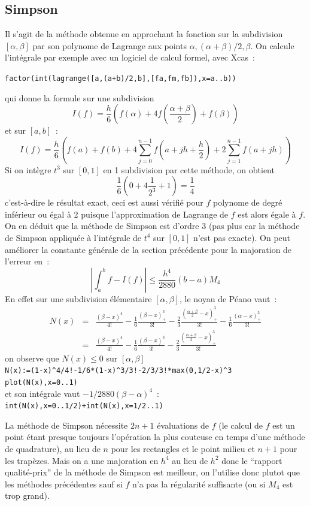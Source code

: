 \documentclass[a4paper,11pt]{article}
\begin{document}
\subsection{Simpson} 
Il s'agit de la méthode obtenue en approchant la fonction
sur la subdivision $[\alpha,\beta]$ par son polynome de Lagrange
aux points $\alpha,(\alpha+\beta)/2,\beta$. On calcule l'int\'egrale
par exemple avec un logiciel de calcul formel, avec Xcas~:
\begin{center}
\verb|factor(int(lagrange([a,(a+b)/2,b],[fa,fm,fb]),x=a..b))| 
\end{center}
qui donne la formule sur une subdivision
\[ I(f) = \frac{h}{6} (f(\alpha)+4f(\frac{\alpha+\beta}{2}) + f(\beta)) \]
et sur $[a,b]$~:
\begin{equation} \label{eq:simpson}
I(f) = \frac{h}{6} \left( f(a)+f(b)+ 4 \sum_{j=0}^{n-1} f(a+jh+\frac{h}{2})
+ 2  \sum_{j=1}^{n-1} f(a+jh) \right)
\end{equation}
Si on intègre $t^3$ sur $[0,1]$ en 1 subdivision par cette méthode,
on obtient
\[ \frac{1}{6} (0+ 4 \frac{1}{2^3} + 1)=\frac{1}{4} \]
c'est-à-dire le résultat exact, ceci est aussi vérifié pour $f$ polynome
de degré inférieur ou égal à 2 puisque l'approximation de Lagrange
de $f$ est alors égale à $f$. On en déduit que la méthode de Simpson
est d'ordre 3 (pas plus car la méthode
de Simpson appliquée à l'intégrale de
$t^4$ sur $[0,1]$ n'est pas exacte). On peut améliorer
la constante générale de la section précédente pour la majoration
de l'erreur en~:
\[ |\int_a^b f - I(f)| \leq \frac{h^4}{2880} (b-a) M_4 \]
En effet sur une subdivision \'el\'ementaire $[\alpha,\beta]$, 
le noyau de P\'eano vaut~:
\begin{eqnarray*}
 N(x) &=&
\frac{(\beta-x)^4}{4!} - \frac16 \frac{(\beta-x)_+^{3}}{3!}
-\frac23 \frac{(\frac{\alpha+\beta}2-x)_+^{3}}{3!} - 
\frac16 \frac{(\alpha-x)_+^{3}}{3!} \\
& =&
\frac{(\beta-x)^4}{4!} - \frac16 \frac{(\beta-x)^{3}}{3!}
-\frac23 \frac{(\frac{\alpha+\beta}2-x)_+^{3}}{3!} 
\end{eqnarray*}
on observe que $N(x)\leq 0$ sur $[\alpha,\beta]$ \\
\verb|N(x):=(1-x)^4/4!-1/6*(1-x)^3/3!-2/3/3!*max(0,1/2-x)^3|\\
\verb|plot(N(x),x=0..1)|\\
et son int\'egrale vaut $-1/2880(\beta-\alpha)^4$~:\\
\verb|int(N(x),x=0..1/2)+int(N(x),x=1/2..1)|

La méthode de Simpson nécessite $2n+1$ évaluations de $f$ (le calcul
de $f$ est un point étant presque toujours 
l'opération la plus couteuse en temps d'une
méthode de quadrature), au lieu de $n$ pour les rectangles
et le point milieu et $n+1$ pour les trapèzes. Mais on a une majoration
en $h^4$ au lieu de $h^2$ donc le ``rapport qualité-prix'' de la méthode
de Simpson est meilleur, on l'utilise donc plutot que les
m\'ethodes pr\'ec\'edentes sauf si $f$ n'a pas la r\'egularit\'e
suffisante (ou si $M_4$ est trop grand).
\end{document}
